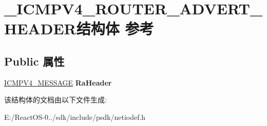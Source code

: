 \hypertarget{struct___i_c_m_p_v4___r_o_u_t_e_r___a_d_v_e_r_t___h_e_a_d_e_r}{}\section{\+\_\+\+I\+C\+M\+P\+V4\+\_\+\+R\+O\+U\+T\+E\+R\+\_\+\+A\+D\+V\+E\+R\+T\+\_\+\+H\+E\+A\+D\+E\+R结构体 参考}
\label{struct___i_c_m_p_v4___r_o_u_t_e_r___a_d_v_e_r_t___h_e_a_d_e_r}
\subsection*{Public 属性}
\begin{DoxyCompactItemize}
\item 
\mbox{\label{struct___i_c_m_p_v4___r_o_u_t_e_r___a_d_v_e_r_t___h_e_a_d_e_r_a3740aab4d0537096be360a6362461961}} 
\hyperlink{struct___i_c_m_p___m_e_s_s_a_g_e}{I\+C\+M\+P\+V4\+\_\+\+M\+E\+S\+S\+A\+GE} {\bfseries Ra\+Header}
\end{DoxyCompactItemize}


该结构体的文档由以下文件生成\+:\begin{DoxyCompactItemize}
\item 
E\+:/\+React\+O\+S-\/0../sdk/include/psdk/netiodef.\+h\end{DoxyCompactItemize}
